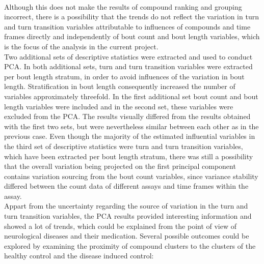\documentclass[a4paper,12pt]{article}
\begin{document}
\\Although this does not make the results of compound ranking and grouping incorrect, there is a possibility that the trends do not reflect the variation in turn and turn transition variables attributable to influences of compounds and time frames directly and independently of bout count and bout length variables, which is the focus of the analysis in the current project.
\\Two additional sets of descriptive statistics were extracted and used to conduct PCA. In both additional sets, turn and turn transition variables were extracted per bout length stratum, in order to avoid influences of the variation in bout length. Stratification in bout length consequently increased the number of variables approximately threefold. In the first additional set bout count and bout length variables were included and in the second set, these variables were excluded from the PCA. The results visually differed from the results obtained with the first two sets, but were nevertheless similar between each other as in the previous case. Even though the majority of the estimated influential variables in the third set of descriptive statistics were turn and turn transition variables, which have been extracted per bout length stratum, there was still a possibility that the overall variation being projected on the first principal component contains variation sourcing from the bout count variables, since variance stability differed between the count data of different assays and time frames within the assay.\\Appart from the uncertainty regarding the source of variation in the turn and turn transition variables, the PCA results provided interesting information and showed a lot of trends, which could be explained from the point of view of neurological diseases and their medication. Several possible outcomes could be explored by examining the proximity of compound clusters to the clusters of the healthy control and the disease induced control:
\end{document}
